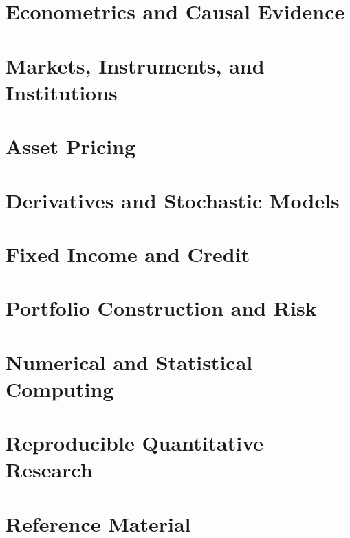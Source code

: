 \documentclass[12pt,oneside,openany]{book}
\begin{document}
\part{Econometrics and Causal Evidence}\label{part:econometrics}


\part{Markets, Instruments, and Institutions}\label{part:markets}


\part{Asset Pricing}\label{part:assetpricing}


\part{Derivatives and Stochastic Models}\label{part:derivatives}


\part{Fixed Income and Credit}\label{part:fixedincome}


\part{Portfolio Construction and Risk}\label{part:portfolio}


\part{Numerical and Statistical Computing}\label{part:numerical}


\part{Reproducible Quantitative Research}\label{part:research}


\appendix
\part{Reference Material}

\end{document}
